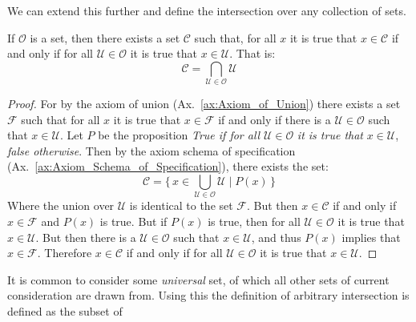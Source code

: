         We can extend this further and define the intersection over any
        collection of sets.
        \begin{theorem}
            \label{thm:Existence_of_Arbitrary_Intersetions}%
            If $\mathcal{O}$ is a set, then there exists a set
            $\mathcal{C}$ such that, for all $x$ it is true that
            $x\in\mathcal{C}$ if and only if for all
            $\mathcal{U}\in\mathcal{O}$ it is true that $x\in\mathcal{U}$.
            That is:
            \begin{equation}
                \mathcal{C}=\bigcap_{\mathcal{U}\in\mathcal{O}}\mathcal{U}
            \end{equation}
        \end{theorem}
        \begin{proof}
            For by the axiom of union (Ax.~\ref{ax:Axiom_of_Union}) there
            exists a set $\mathcal{F}$ such that for all $x$ it is true that
            $x\in\mathcal{F}$ if and only if there is a
            $\mathcal{U}\in\mathcal{O}$ such that $x\in\mathcal{U}$. Let
            $P$ be the proposition \textit{True if for all}
            $\mathcal{U}\in\mathcal{O}$ \textit{it is true that}
            $x\in\mathcal{U}$, \textit{false otherwise}. Then by the
            axiom schema of specification
            (Ax.~\ref{ax:Axiom_Schema_of_Specification}), there exists the
            set:
            \begin{equation}
                \mathcal{C}
                =\Big\{\,x\in\bigcup_{\mathcal{U}\in\mathcal{O}}\mathcal{U}
                    \;|\;P(x)\,\Big\}
            \end{equation}
            Where the union over $\mathcal{U}$ is identical to the set
            $\mathcal{F}$. But then $x\in\mathcal{C}$ if and only if
            $x\in\mathcal{F}$ and $P(x)$ is true. But if $P(x)$ is true,
            then for all $\mathcal{U}\in\mathcal{O}$ it is true that
            $x\in\mathcal{U}$. But then there is a
            $\mathcal{U}\in\mathcal{O}$ such that $x\in\mathcal{U}$, and
            thus $P(x)$ implies that $x\in\mathcal{F}$. Therefore
            $x\in\mathcal{C}$ if and only if for all
            $\mathcal{U}\in\mathcal{O}$ it is true that $x\in\mathcal{U}$.
        \end{proof}
        It is common to consider some \textit{universal} set, of which all
        other sets of current consideration are drawn from. Using this the
        definition of arbitrary intersection is defined as the subset of
